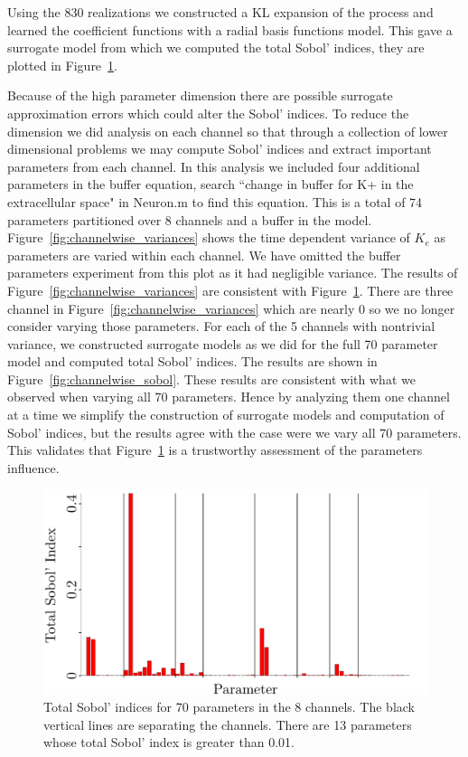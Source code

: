 \documentclass{article}
\begin{document}
Using the 830 realizations we constructed a KL expansion of the process and learned the coefficient functions with a radial basis functions model. This gave a surrogate model from which we computed the total Sobol' indices, they are plotted in Figure~\ref{fig:all_parameters}.

Because of the high parameter dimension there are possible surrogate approximation errors which could alter the Sobol' indices. To reduce the dimension we did analysis on each channel so that through a collection of lower dimensional problems we may compute Sobol' indices and extract important parameters from each channel. In this analysis we included four additional parameters in the buffer equation, search ``change in buffer for K+ in the extracellular space" in Neuron.m to find this equation. This is a total of 74 parameters partitioned over 8 channels and a buffer in the model. Figure~\ref{fig:channelwise_variances} shows the time dependent variance of $K_e$ as parameters are varied within each channel. We have omitted the buffer parameters experiment from this plot as it had negligible variance. The results of Figure~\ref{fig:channelwise_variances} are consistent with Figure~\ref{fig:all_parameters}. There are three channel in Figure~\ref{fig:channelwise_variances} which are nearly 0 so we no longer consider varying those parameters. For each of the 5 channels with nontrivial variance, we constructed surrogate models as we did for the full 70 parameter model and computed total Sobol' indices. The results are shown in Figure~\ref{fig:channelwise_sobol}. These results are consistent with what we observed when varying all 70 parameters. Hence by analyzing them one channel at a time we simplify the construction of surrogate models and computation of Sobol' indices, but the results agree with the case were we vary all 70 parameters. This validates that Figure~\ref{fig:all_parameters} is a trustworthy assessment of the parameters influence.

\newpage
\begin{figure}[h]
\begin{center}
\includegraphics[scale=.25]{Figures/All_Parameters.pdf}
\end{center}
\caption{Total Sobol' indices for 70 parameters in the 8 channels. The black vertical lines are separating the channels. There are 13 parameters whose total Sobol' index is greater than 0.01.}
\label{fig:all_parameters}
\end{figure}
\end{document}
